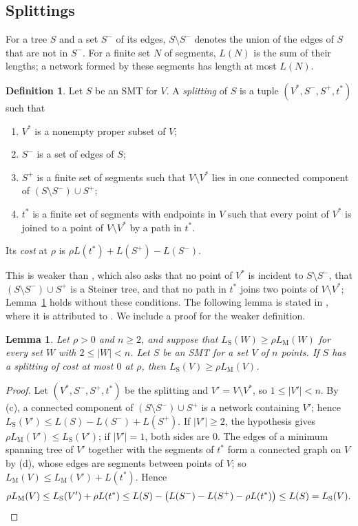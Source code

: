 \documentclass[11pt]{amsart}
\newtheorem{lemma}[theorem]{Lemma}
\theoremstyle{definition}
\newtheorem{definition}[theorem]{Definition}
\theoremstyle{remark}
\numberwithin{equation}{section}
\newcommand{\LS}{L_{\mathrm S}}
\newcommand{\LM}{L_{\mathrm M}}
\begin{document}
\subsection{Splittings}
For a tree $S$ and a set $S^-$ of its edges, $S\setminus S^-$ denotes the union of the edges of $S$ that are not in $S^-$. For a finite set $N$ of segments, $L(N)$ is the sum of their lengths; a network formed by these segments has length at most $L(N)$.

\begin{definition}\label{def:split}
Let $S$ be an SMT for $V$. A \emph{splitting} of $S$ is a tuple $(V^*,S^-,S^+,t^*)$ such that
\begin{enumerate}[label=(\alph*)]
\item $V^*$ is a nonempty proper subset of $V$;
\item $S^-$ is a set of edges of $S$;
\item $S^+$ is a finite set of segments such that $V\setminus V^*$ lies in one connected component of $(S\setminus S^-)\cup S^+$;
\item $t^*$ is a finite set of segments with endpoints in $V$ such that every point of $V^*$ is joined to a point of $V\setminus V^*$ by a path in $t^*$.
\end{enumerate}
Its \emph{cost} at $\rho$ is $\rho L(t^*)+L(S^+)-L(S^-)$.
\end{definition}

This is weaker than \cite[Definition~13]{KHSHGW}, which also asks that no point of $V^*$ is incident to $S\setminus S^-$, that $(S\setminus S^-)\cup S^+$ is a Steiner tree, and that no path in $t^*$ joins two points of $V\setminus V^*$; Lemma~\ref{lem:dh} holds without these conditions. The following lemma is stated in \cite[Lemma~14]{KHSHGW}, where it is attributed to \cite[Lemma~3]{DH83}. We include a proof for the weaker definition.

\begin{lemma}\label{lem:dh}
Let $\rho>0$ and $n\ge2$, and suppose that $\LS(W)\ge\rho\LM(W)$ for every set $W$ with $2\le|W|<n$. Let $S$ be an SMT for a set $V$ of $n$ points. If $S$ has a splitting of cost at most $0$ at $\rho$, then $\LS(V)\ge\rho\LM(V)$.
\end{lemma}

\begin{proof}
Let $(V^*,S^-,S^+,t^*)$ be the splitting and $V'=V\setminus V^*$, so $1\le|V'|<n$. By (c), a connected component of $(S\setminus S^-)\cup S^+$ is a network containing $V'$; hence $\LS(V')\le L(S)-L(S^-)+L(S^+)$. If $|V'|\ge2$, the hypothesis gives $\rho\LM(V')\le\LS(V')$; if $|V'|=1$, both sides are $0$. The edges of a minimum spanning tree of $V'$ together with the segments of $t^*$ form a connected graph on $V$ by (d), whose edges are segments between points of $V$; so $\LM(V)\le\LM(V')+L(t^*)$. Hence
\[
\rho\LM(V)\le\LS(V')+\rho L(t^*)\le L(S)-\bigl(L(S^-)-L(S^+)-\rho L(t^*)\bigr)\le L(S)=\LS(V).\qedhere
\]
\end{proof}
\end{document}
